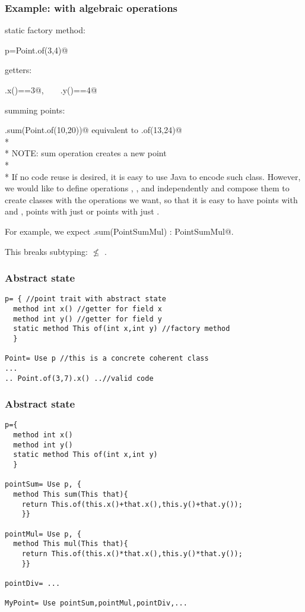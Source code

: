 \begin{frame}[fragile]
\frametitle{Example: \Q@Point@s with algebraic operations}

static factory method:

\quad\quad \Q@Point p=Point.of(3,4)@

getters:

\quad\quad \Q@p.x()==3@,\ \ \ \   \Q@p.y()==4@

summing points:

\quad\quad \Q@p.sum(Point.of(10,20))@ equivalent to \Q@Point.of(13,24)@
\\*${}_{}$\\*
NOTE: sum operation creates a new point
\\*${}_{}$\\*
If no code reuse is desired, it is easy to use Java to encode such \Q@Point@ class.
However, we would like to define operations \Q@sum@, \Q@mul@, \Q@div@ and \Q@sub@
independently and compose them to create classes with the operations we want,
so that it is easy to have points with \Q@sum@ and \Q@mul@, points with
just \Q@sum@ or points with just \Q@mul@.

For example, we expect \Q@PointSumMul.sum(PointSumMul) : PointSumMul@.

This breaks subtyping: \Q@PointSumMul@ $\not\leq$ \Q@PointSum@.


\end{frame}

\begin{frame}[fragile]
\frametitle{Abstract state}
\begin{lstlisting}
p= { //point trait with abstract state
  method int x() //getter for field x
  method int y() //getter for field y
  static method This of(int x,int y) //factory method
  }

Point= Use p //this is a concrete coherent class
...
.. Point.of(3,7).x() ..//valid code
\end{lstlisting}
\end{frame}


\begin{frame}[fragile]
\frametitle{Abstract state}
\begin{lstlisting}
p={
  method int x()
  method int y()
  static method This of(int x,int y)
  }

pointSum= Use p, {
  method This sum(This that){
    return This.of(this.x()+that.x(),this.y()+that.y());
    }}

pointMul= Use p, {
  method This mul(This that){
    return This.of(this.x()*that.x(),this.y()*that.y());
    }}

pointDiv= ...

MyPoint= Use pointSum,pointMul,pointDiv,...

\end{lstlisting}
\end{frame}


